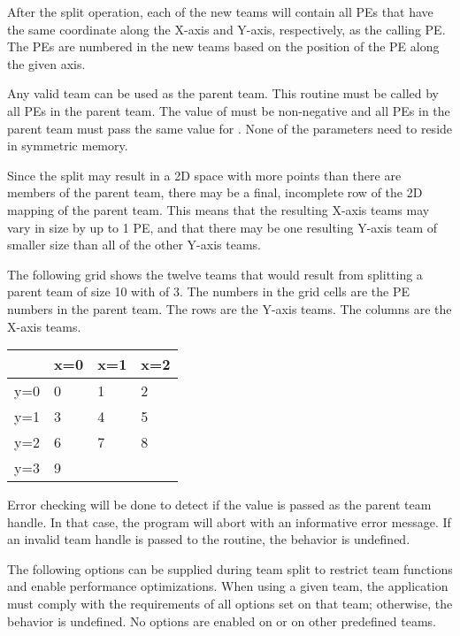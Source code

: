\begin{apidefinition}
{After the split operation, each of the new teams will contain all \acp{PE} that have the same
coordinate along the X-axis and Y-axis, respectively, as the calling \ac{PE}. The
\acp{PE} are numbered in the new teams based on the position of the \ac{PE} along
the given axis.

Any valid \openshmem team can be used as the parent team. This routine must be
called by all \acp{PE} in the parent team. The value of  must be
non-negative and all \acp{PE} in the parent team must pass the same value for
. None of the parameters need to reside in symmetric memory.

Since the split may result in a 2D space with more points than there are members of
the parent team, there may be a final, incomplete row of the 2D mapping of the parent
team. This means that the resulting X-axis teams may vary in size by up to 1 \ac{PE},
and that there may be one resulting Y-axis team of smaller size than all of the other
Y-axis teams.

The following grid shows the twelve teams that would result from splitting a parent team
of size 10 with  of 3. The numbers in the grid cells are the \ac{PE} numbers
in the parent team. The rows are the Y-axis teams. The columns are the X-axis teams.

\begin{center}
\begin{tabular}{|l|l|l|l|}
 \hline
      & x=0 & x=1 & x=2  \\ \hline
 y=0  & 0   & 1   & 2  \\ \hline
 y=1  & 3   & 4   & 5  \\ \hline
 y=2  & 6   & 7   & 8  \\ \hline
 y=3  & 9     \\
 \cline{0-1} 
\end{tabular}
\end{center}

Error checking will be done to detect if the value 
is passed as the parent team handle. In that case, the program will abort with
an informative error message. If an invalid team handle is passed to the
routine, the behavior is undefined.

The following options can be supplied during team split to restrict
team functions and enable performance optimizations.  When using a given
team, the application must comply with the requirements of all options
set on that team; otherwise, the behavior is undefined.
No options are enabled on  or on other
predefined \openshmem teams.

}
\end{apidefinition}
